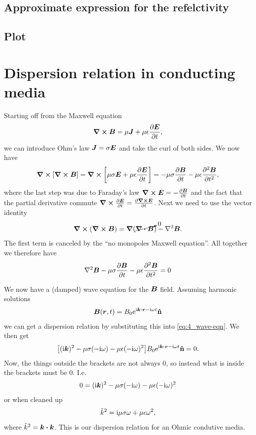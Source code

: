 \documentclass[11pt,letter, swedish, english
]{article}
\begin{document}
\subsection{Approximate expression for the refelctivity}


\subsection{Plot}



\section{Dispersion relation in conducting media}
Starting off from the Maxwell equation
\begin{equation}
\curl\vb*B = \mu\vb*J + \mu\epsilon\pdv{\vb*E}{t},
\end{equation}
we can introduce Ohm's law $\vb*J=\sigma\vb*E$ and take the curl of
both sides. We now have
\begin{equation}\label{eq:4_wave-eqn}
\curl[\curl\vb*B] = 
\curl\qty[\mu\sigma\vb*E + \mu\epsilon\pdv{\vb*E}{t}]
=-\mu\sigma\pdv{\vb*B}{t} - \mu\epsilon\pdv[2]{\vb*B}{t},
\end{equation}
where the last step was due to Faraday's law 
$\curl\vb*E = -\pdv{\vb*B}{t}$ and the fact that the partial
derivative commute $\curl\pdv{\vb*E}{t} = \pdv{\curl\vb*E}{t}$. 
Next we need to use the vector identity
\begin{equation}
\curl(\curl\vb*B) = \grad{}(\cancelto{0}{\div\vb*B}) - \laplacian\vb*B.
\end{equation}
The first term is canceled by the ``no monopoles Maxwell
equation''. All together we therefore have
\begin{equation}\label{eq:4_wave-eqn}
\laplacian\vb*B
-\mu\sigma\pdv{\vb*B}{t} - \mu\epsilon\pdv[2]{\vb*B}{t} =0
\end{equation}

We now have a (damped) wave equation for the $\vb*B$ field. Assuming
harmonic solutions
\begin{equation}
\vb*B(\vb*r, t) = B_0\ee^{\ii\vb*k\vdot\vb*r - \ii\omega t}\vu{n}
\end{equation}
we can get a dispersion relation by substituting this into
\eqref{eq:4_wave-eqn}. We then get
\begin{equation}
\qty[(\ii\vb*k)^2
-\mu\sigma(-\ii\omega) - \mu\epsilon(-\ii\omega)^2
]B_0\ee^{\ii\vb*k\vdot\vb*r - \ii\omega t}\vu{n} =0.
\end{equation}
Now, the things outside the brackets are not always 0, so instead what
is inside the brackets must be 0. I.e.
\begin{equation}
0=(\mathrm{i}\vb*k)^2
-\mu\sigma(-\mathrm{i}\omega) - \mu\epsilon(-\mathrm{i}\omega)^2
\end{equation}
or when cleaned up
\begin{equation}\label{eq:4_disp}
\tilde{k}^2 = \mathrm{i}\mu\sigma\omega +\mu\epsilon\omega^2,
\end{equation}
where $\kt^2 = \vb*k\vdot\vb*k$.
This is our dispersion relation for an Ohmic condutive media. 
\end{document}
